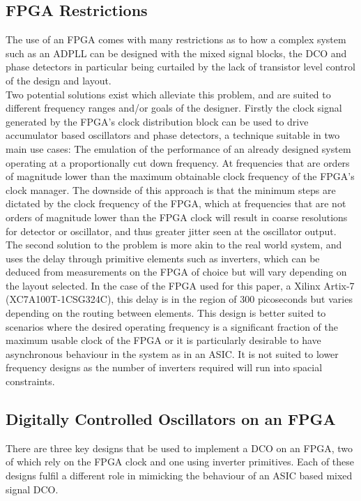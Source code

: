 \documentclass[conference]{IEEEtran}
\begin{document}
\subsection{FPGA Restrictions}
The use of an FPGA comes with many restrictions as to how a complex system such as an ADPLL can be designed with the mixed signal blocks, the DCO and phase detectors in particular being curtailed by the lack of transistor level control of the design and layout.\\
Two potential solutions exist which alleviate this problem, and are suited to different frequency ranges and/or goals of the designer. Firstly the clock signal generated by the FPGA's clock distribution block can be used to drive accumulator based oscillators and phase detectors, a technique suitable in two main use cases: The emulation of the performance of an already designed system operating at a proportionally cut down frequency. At frequencies that are orders of magnitude lower than the maximum obtainable clock frequency of the FPGA's clock manager.
The downside of this approach is that the minimum steps are dictated by the clock frequency of the FPGA, which at frequencies that are not orders of magnitude lower than the FPGA clock will result in coarse resolutions for detector or oscillator, and thus greater jitter seen at the oscillator output.\\
The second solution to the problem is more akin to the real world system, and uses the delay through primitive elements such as inverters, which can be deduced from measurements on the FPGA of choice but will vary depending on the layout selected. In the case of the FPGA used for this paper, a Xilinx Artix-7 (XC7A100T-1CSG324C), this delay is in the region of 300 picoseconds but varies depending on the routing between elements. This design is better suited to scenarios where the desired operating frequency is a significant fraction of the maximum usable clock of the FPGA or it is particularly desirable to have asynchronous behaviour in the system as in an ASIC. It is not suited to lower frequency designs as the number of inverters required will run into spacial constraints.
\subsection{Digitally Controlled Oscillators on an FPGA}
There are three key designs that be used to implement a DCO on an FPGA, two of which rely on the FPGA clock and one using inverter primitives. Each of these designs fulfil a different role in mimicking the behaviour of an ASIC based mixed signal DCO.
\end{document}
